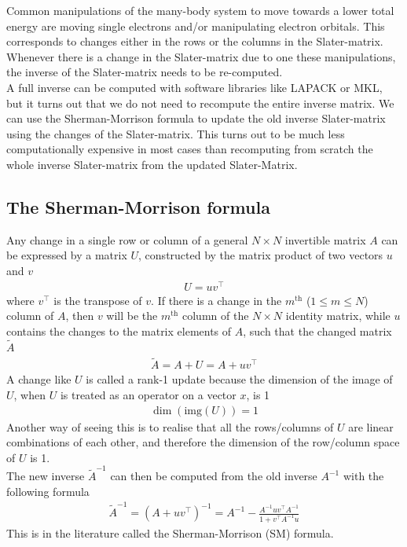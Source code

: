 \documentclass[11pt]{article}
\numberwithin{figure}{section}
\numberwithin{table}{section}
\begin{document}
			Common manipulations of the many-body system to move towards a lower total energy are moving single electrons and/or manipulating electron orbitals. This corresponds to changes either in the rows or the columns in the Slater-matrix. Whenever there is a change in the Slater-matrix due to one these manipulations, the inverse of the Slater-matrix needs to be re-computed.\\
			
			A full inverse can be computed with software libraries like LAPACK\cite{lapack} or MKL\cite{intel-mkl}, but it turns out that we do not need to recompute the entire inverse matrix. We can use the Sherman-Morrison formula to update the old inverse Slater-matrix using the changes of the Slater-matrix. This turns out to be much less computationally expensive in most cases than recomputing from scratch the whole inverse Slater-matrix from the updated Slater-Matrix.
			
		\subsection{The Sherman-Morrison formula}\label{sec:problem}
			
			Any change in a single row or column of a general $N\times N$ invertible matrix $A$ can be expressed by a matrix $U$, constructed by the matrix product of two vectors $u$ and $v$
			\begin{align}
				U=uv^\top
			\end{align}
			where $v^\top$ is the transpose of $v$.
			If there is a change in the $m^\mathrm{th}$ ($1\leq m\leq N$) column of $A$, then $v$ will be the $m^\mathrm{th}$ column of the $N\times N$ identity matrix, while $u$ contains the changes to the matrix elements of $A$, such that the changed matrix $\widetilde{A}$
			\begin{align}
				\widetilde{A} = A + U = A + uv^\top
			\end{align}
			A change like $U$ is called a rank-1 update because the dimension of the image of $U$, when $U$ is treated as an operator on a vector $x$, is 1
			\begin{align}
				\dim(\mathrm{img}(U))=1
			\end{align}
			Another way of seeing this is to realise that all the rows/columns of $U$ are linear combinations of each other, and therefore the dimension of the row/column space of $U$ is 1.\\
			
			The new inverse $\widetilde{A}^{-1}$ can then be computed from the old inverse $A^{-1}$ with the following formula
			\begin{align}
				\widetilde{A}^{-1}=\left(A+uv^\top\right)^{-1} = A^{-1} - \frac{A^{-1}uv^\top A^{-1}}{1+v^\top A^{-1}u}
			\end{align}
			This is in the literature called the Sherman-Morrison (SM) formula.
			
\end{document}
